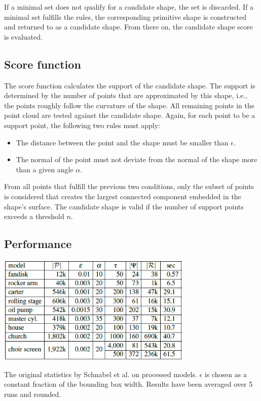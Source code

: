 \begin{itemize}
If a minimal set does not qualify for a candidate shape, the set is discarded. If a minimal set fulfills the rules, the corresponding primitive shape is constructed and returned to as a candidate shape. From there on, the candidate shape score is evaluated. 

\end{itemize} 

\subsection{Score function}
\label{sec:scorefun}

The score function calculates the support of the candidate shape. The support is determined by the number of points that are approximated by this shape, i.e., the points roughly follow the curvature of the shape. All remaining points in the point cloud are tested against the candidate shape. Again, for each point to be a support point, the following two rules must apply: 

\begin{itemize}
    \item The distance between the point and the shape must be smaller than $\epsilon$.
    \item The normal of the point must not deviate from the normal of the shape more than a given angle $\alpha$.
\end{itemize}

From all points that fulfill the previous two conditions, only the subset of points is considered that creates the largest connected component embedded in the shape's surface. The candidate shape is valid if the number of support points exceeds a threshold $n$. 


\subsection{Performance}
\label{sec:performance}

\begin{table}
    \centering
    \includegraphics[width=0.7\textwidth]{Shape_Detection/schnabel-performance.png}
    \caption[Original statistics of the shape detection algorithm by Schabel et al.]{The original statistics by Schnabel et al. \cite{schnabel-2007-efficient} on processed models. $\epsilon$ is chosen as a constant fraction of the bounding box width. Results have been averaged over 5 runs and rounded.}
    \label{table:schnabel_performance}
\end{table}


